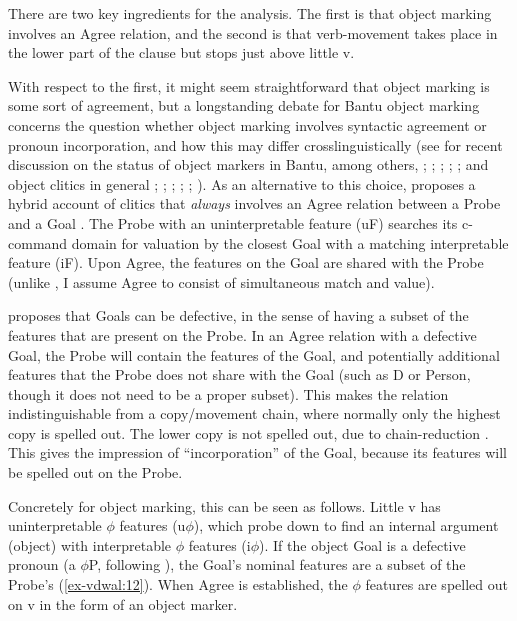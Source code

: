 \documentclass[output=paper
,modfonts
,nonflat]{langsci/langscibook}
\begin{document}
There are two key ingredients for the analysis. The first is that object marking involves an Agree relation, and the second is that verb-movement takes place in the lower part of the clause but stops just above little v.

With respect to the first, it might seem straightforward that object marking is some sort of agreement, but a longstanding debate for Bantu object marking concerns the question whether object marking involves syntactic agreement or pronoun incorporation, and how this may differ crosslinguistically (see for recent discussion on the status of object markers in Bantu, among others, \citealt{Henderson2006}; \citealt{Riedel2009}; \citealt{Zeller2012}; \citealt{Iorio2014}; \citealt{Baker2016}; and object clitics in general \citealt{Preminger2009}; \citealt{Nevins2011}; \citealt{Anagnostopoulou2014, Anagnostopoulou2016}; \citealt{Kramer2014}; \citealt{Harizanov2014}; \citealt{Baker_Kramer2016}). As an alternative to this choice, \citet{Roberts2010} proposes a hybrid account of clitics that \textit{always} involves an Agree relation between a Probe and a Goal \citep{Chomsky2000, Chomsky2001}. The Probe with an uninterpretable feature (uF) searches its c-command domain for valuation by the closest Goal with a matching interpretable feature (iF). Upon Agree, the features on the Goal are shared with the Probe (unlike , I assume Agree to consist of
simultaneous match and value).

\citet{Roberts2010} proposes that Goals can be defective, in the sense of having a subset of the features that are present on the Probe. In an Agree relation with a defective Goal, the Probe will contain the features of the Goal, and potentially additional features that the Probe does not share with the Goal (such as D or Person, though it does not need to be a proper subset). This makes the relation indistinguishable from a copy/movement chain, where normally only the highest copy is spelled out. The lower copy is not spelled out, due to chain-reduction \citep{Nunes2004}. This gives the impression of “incorporation” of the Goal, because its features will be spelled out on the Probe.

Concretely for object marking, this can be seen as follows. Little v has uninterpretable $\phi $ features (u$\phi$), which probe down to find an internal argument (object) with interpretable $\phi$ features (i$\phi$). If the object Goal is a defective pronoun (a $\phi$P, following \citealt{Dechaine_Wiltschko2002}), the Goal’s nominal features are a subset of the Probe’s (\ref{ex-vdwal:12}). When Agree is established, the $\phi$ features are spelled out on v in the form of an object marker.
\end{document}

